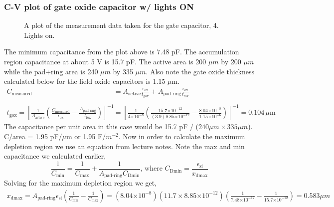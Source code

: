 \documentclass{article}
\providecommand{\e}[1]{\ensuremath{\times 10^{#1}}}
\begin{document}
\subsubsection{C-V plot of gate oxide capacitor w/ lights ON}
\begin{figure}[H]
\centering
{}
\caption{A plot of the measurement data taken for the gate capacitor, 4. Lights on.}
\end{figure}

The minimum capacitance from the plot above is 7.48 pF. The accumulation region capacitance at about 5 V is 15.7 pF. The active area is 200 $\mu m$ by 200 $\mu m$ while the pad+ring area is 240 $\mu m$ by 335 $\mu m$. Also note the gate oxide thickness calculated below for the field oxide capacitors is 1.15 $\mu$m.
\begin{align*}
C_{\text{measured}} &= A_{\text{active}}\frac{\epsilon_{\text{ox}}}{t_{\text{gox}}} + A_{\text{pad-ring}}\frac{\epsilon_{\text{ox}}}{t_{\text{fox}}} \\ \\
t_{\text{gox}} = [\frac{1}{A_{\text{active}}}(\frac{C_{\text{measured}}}{\epsilon_{\text{ox}}} - \frac{A_{\text{pad-ring}}}{t_{\text{fox}}})]^{-1} &= [\frac{1}{4\e{-8}}(\frac{15.7\e{-12}}{(3.9)8.85\e{-12}} - \frac{8.04\e{-8}}{1.15\e{-6}})]^{-1} = 0.104 \,\mu\text{m}
\end{align*}
The capacitance per unit area in this case would be 15.7 pF / ($240 \mu m \times 335 \mu m$). C/area = 1.95 pF/$\mu$m or 1.95 F/$m^{-2}$. Now in order to calculate the maximum depletion region we use an equation from lecture notes. Note the max and min capacitance we calculated earlier,
\begin{equation}
\frac{1}{C_{\text{min}}} = \frac{1}{C_{\text{max}}} + \frac{1}{A_{\text{pad-ring}} C_{\text{Dmin}}},\,\text{where } C_{\text{Dmin}} = \frac{\epsilon_{\text{si}}}{x_{\text{dmax}}}
\end{equation}
Solving for the maximum depletion region we get,
\begin{align*}
x_{\text{dmax}} = A_{\text{pad-ring}}\epsilon_{\text{si}}(\frac{1}{C_{\text{min}}} - \frac{1}{C_{\text{max}}}) = (8.04\e{-8})(11.7 \times 8.85\e{-12})(\frac{1}{7.48\e{-12}} - \frac{1}{15.7\e{-12}}) = 0.583 \mu m
\end{align*}
\end{document}
